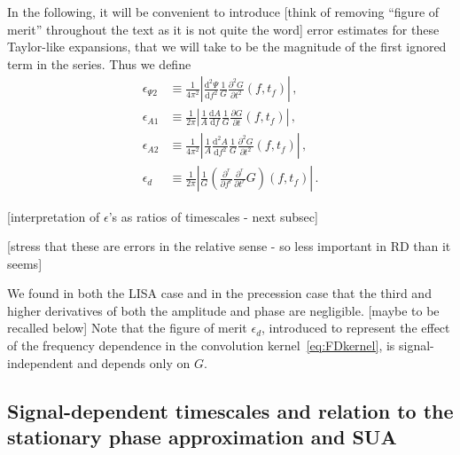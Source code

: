 \documentclass[aps,showpacs,twocolumn,
prd,superscriptaddress,nofootinbib]{revtex4-1}
\newcommand\ud{{\mathrm{d}}}
\newcommand{\tf}{t_{f}}
\newcommand{\SM}[1]{{\color{Red} #1}}
\begin{document}
In the following, it will be convenient to introduce \SM{[think of removing ``figure of merit'' throughout the text as it is not quite the word]} error estimates for these Taylor-like expansions, that we will take to be the magnitude of the first ignored term in the series. Thus we define
\begin{subequations}\label{eq:deffom}
\begin{align}
	\epsilon_{\Psi 2} &\equiv \frac{1}{4\pi^{2}} \left| \frac{\ud^{2} \Psi}{\ud f^{2}} \frac{1}{G} \frac{\partial^{2} G}{\partial t^{2}}(f, \tf) \right| \,, \\
	\epsilon_{A 1} &\equiv \frac{1}{2\pi} \left| \frac{1}{A}\frac{\ud A}{\ud f} \frac{1}{G} \frac{\partial G}{\partial t}(f, \tf) \right| \,, \\
	\epsilon_{A 2} &\equiv \frac{1}{4\pi^{2}} \left| \frac{1}{A}\frac{\ud^{2} A}{\ud f^{2}} \frac{1}{G} \frac{\partial^{2} G}{\partial t^{2}}(f, \tf) \right| \,, \\
	\epsilon_{d} &\equiv \frac{1}{2\pi} \left| \frac{1}{G} \left( \frac{\partial^{r} }{\partial f^{r}} \frac{\partial^{r} }{\partial t^{r}} G \right)(f, \tf) \right| \,.
\end{align}
\end{subequations}

\SM{[interpretation of $\epsilon$'s as ratios of timescales - next subsec]}

\SM{[stress that these are errors in the relative sense - so less important in RD than it seems]}

We found in both the LISA case and in the precession case that the third and higher derivatives of both the amplitude and phase are negligible. \SM{[maybe to be recalled below]} Note that the figure of merit $\epsilon_{d}$, introduced to represent the effect of the frequency dependence in the convolution kernel~\eqref{eq:FDkernel}, is signal-independent and depends only on $G$.


\subsection{Signal-dependent timescales and relation to the stationary phase approximation and SUA}
\label{subsec:linkSPA}
\end{document}
